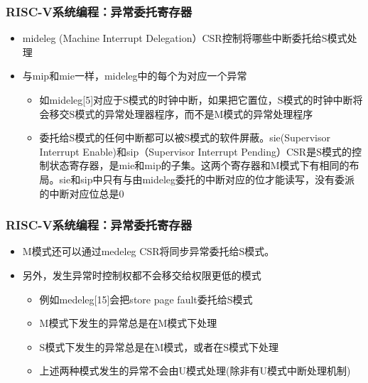 
\begin{frame}
    \frametitle{RISC-V系统编程：异常委托寄存器}
    \begin{itemize}
        \item mideleg (Machine Interrupt Delegation）CSR控制将哪些中断委托给S模式处理
        \item 与mip和mie一样，mideleg中的每个为对应一个异常
        \begin{itemize}
            \item 如mideleg[5]对应于S模式的时钟中断，如果把它置位，S模式的时钟中断将会移交S模式的异常处理器程序，而不是M模式的异常处理程序
            \item 委托给S模式的任何中断都可以被S模式的软件屏蔽。sie(Supervisor Interrupt Enable)和sip（Supervisor Interrupt Pending）CSR是S模式的控制状态寄存器，是mie和mip的子集。这两个寄存器和M模式下有相同的布局。sie和sip中只有与由mideleg委托的中断对应的位才能读写，没有委派的中断对应位总是0    
        \end{itemize}
        
    \end{itemize}
    
\end{frame}


\begin{frame}
    \frametitle{RISC-V系统编程：异常委托寄存器}
    \begin{itemize}
        \item M模式还可以通过medeleg CSR将同步异常委托给S模式。
        \item 另外，发生异常时控制权都不会移交给权限更低的模式
        \begin{itemize}
            \item 例如medeleg[15]会把store page fault委托给S模式
            \item M模式下发生的异常总是在M模式下处理
            \item S模式下发生的异常总是在M模式，或者在S模式下处理
            \item 上述两种模式发生的异常不会由U模式处理(除非有U模式中断处理机制)
        \end{itemize}
        
    \end{itemize}
    
\end{frame}

